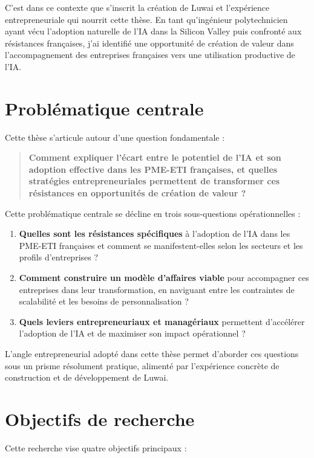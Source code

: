 C'est dans ce contexte que s'inscrit la création de Luwai et l'expérience entrepreneuriale qui nourrit cette thèse. En tant qu'ingénieur polytechnicien ayant vécu l'adoption naturelle de l'IA dans la Silicon Valley puis confronté aux résistances françaises, j'ai identifié une opportunité de création de valeur dans l'accompagnement des entreprises françaises vers une utilisation productive de l'IA.

\section{Problématique centrale}

Cette thèse s'articule autour d'une question fondamentale :

\begin{quote}
\textbf{Comment expliquer l'écart entre le potentiel de l'IA et son adoption effective dans les PME-ETI françaises, et quelles stratégies entrepreneuriales permettent de transformer ces résistances en opportunités de création de valeur ?}
\end{quote}

Cette problématique centrale se décline en trois sous-questions opérationnelles :

\begin{enumerate}
    \item \textbf{Quelles sont les résistances spécifiques} à l'adoption de l'IA dans les PME-ETI françaises et comment se manifestent-elles selon les secteurs et les profils d'entreprises ?
    \item \textbf{Comment construire un modèle d'affaires viable} pour accompagner ces entreprises dans leur transformation, en naviguant entre les contraintes de scalabilité et les besoins de personnalisation ?
    \item \textbf{Quels leviers entrepreneuriaux et managériaux} permettent d'accélérer l'adoption de l'IA et de maximiser son impact opérationnel ?
\end{enumerate}

L'angle entrepreneurial adopté dans cette thèse permet d'aborder ces questions sous un prisme résolument pratique, alimenté par l'expérience concrète de construction et de développement de Luwai.

\section{Objectifs de recherche}

Cette recherche vise quatre objectifs principaux :

